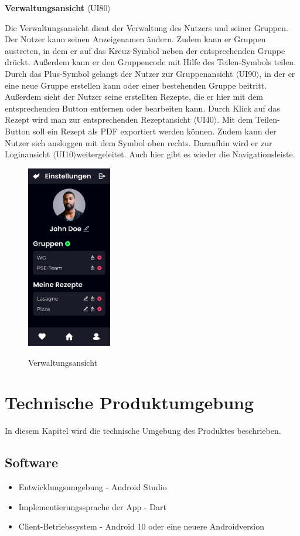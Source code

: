 \documentclass[parskip=full]{scrartcl}
\begin{document}
\textbf{Verwaltungsansicht} $\langle$UI80$\rangle$

Die Verwaltungsansicht dient der Verwaltung des Nutzers und seiner Gruppen. Der Nutzer kann seinen Anzeigenamen ändern. Zudem kann er Gruppen austreten, in dem er auf das Kreuz-Symbol neben der entsprechenden Gruppe drückt. Außerdem kann er den Gruppencode mit Hilfe des Teilen-Symbols teilen. Durch das Plus-Symbol gelangt der Nutzer zur Gruppenansicht $\langle$UI90$\rangle$, in der er eine neue Gruppe erstellen kann oder einer bestehenden Gruppe beitritt. Außerdem sieht der Nutzer seine erstellten Rezepte, die er hier mit dem entsprechenden Button entfernen oder bearbeiten kann. Durch Klick auf das Rezept wird man zur entsprechenden Rezeptansicht $\langle$UI40$\rangle$. Mit dem Teilen-Button soll ein Rezept als PDF exportiert werden können.
Zudem kann der Nutzer sich ausloggen mit dem Symbol oben rechts. Daraufhin wird er zur Loginansicht $\langle$UI10$\rangle$weitergeleitet. Auch hier gibt es wieder die Navigationsleiste.

\begin{figure}[!htp]
    \centering
    \includegraphics[height=80mm]{images/section7/SettingsView.jpg}
    \label{fig:A79}
    \caption{Verwaltungsansicht}
\end{figure}
\newpage
\section{Technische Produktumgebung}
In diesem Kapitel wird die technische Umgebung des Produktes beschrieben.

\subsection{Software}
\begin{itemize}
    \item Entwicklungsumgebung - Android Studio
    \item Implementierungssprache der App - Dart
    \item Client-Betriebssystem - Android 10 oder eine neuere Androidversion
\end{itemize}
\end{document}
